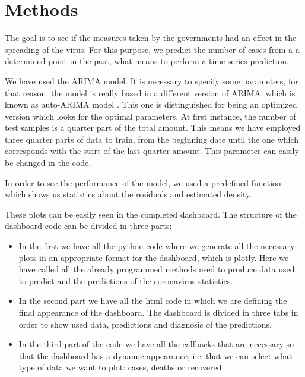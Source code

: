 \documentclass[lang=english,inputenc=utf8,fontsize=10pt]{ldvarticle}
\begin{document}
\section{Methods}
The goal is to see if the measures taken by the governments had an effect in the spreading of the virus. For this purpose, we predict the number of cases from a a determined point in the past, what means to perform a time series prediction.

We have used the ARIMA model. It is necessary to specify some parameters, for that reason, the model is really based in a different version of ARIMA, which is known as auto-ARIMA model \cite{auto_arima}. This one is distinguished for being an optimized version which looks for the optimal parameters. 
At first instance, the number of test samples is a quarter part of the total amount. This means we have employed three quarter parts of data to train, from the beginning date until the one which corresponds with the start of the last quarter amount. This parameter can easily be changed in the code.

In order to see the performance of the model, we used a predefined function \cite{plot_diagnostics} which shows us statistics about the residuals and estimated density.

These plots can be easily seen in the completed dashboard. The structure of the dashboard code can be divided in three parts:
\begin{itemize}
    \item 
    In the first we have all the python code where we generate all the necessary plots in an appropriate format for the dashboard, which is plotly. Here we have called all the already programmed methods used to produce data used to predict and the predictions of the coronavirus statistics.
    \item
    In the second part we have all the html code in which we are defining the final appearance of the dashboard. The dashboard is divided in three tabs in order to show used data, predictions and diagnosis of the predictions.
    \item
    In the third part of the code we have all the callbacks that are necessary so that the dashboard has a dynamic appearance, i.e. that we can select what type of data we want to plot: cases, deaths or recovered.
\end{itemize}
    
\end{document}
